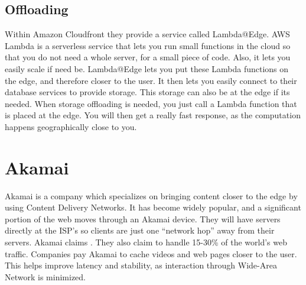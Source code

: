 \subsection{Offloading}
Within Amazon Cloudfront they provide a service called Lambda@Edge. AWS Lambda is a serverless service that lets you run small functions in the cloud so that you do not need a whole server, for a small piece of code. Also, it lets you easily scale if need be. Lambda@Edge lets you put these Lambda functions on the edge, and therefore closer to the user. It then lets you easily connect to their database services to provide storage. This storage can also be at the edge if its needed. When storage offloading is needed, you just call a Lambda function that is placed at the edge. You will then get a really fast response, as the computation happens geographically close to you.




\section{Akamai}
Akamai is a company which specializes on bringing content closer to the edge by using Content Delivery Networks. It has become widely popular, and a significant portion of the web moves through an Akamai device. They will have servers directly at the ISP’s so clients are just one “network hop” away from their servers. Akamai\cite{noauthor_exceptional_nodate} claims . They also claim to handle 15-30\% of the world's web traffic. Companies pay Akamai to cache videos and web pages closer to the user. This helps improve latency and stability, as interaction through Wide-Area Network is minimized. 

